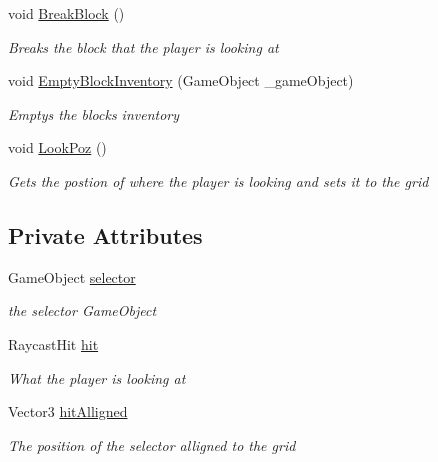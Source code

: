 \begin{DoxyCompactItemize}
void \hyperlink{class_bee_game_1_1_player_1_1_player_interact_a3507c5b70c4aecb332338d518b691875}{Break\+Block} ()
\begin{DoxyCompactList}\small\item\em Breaks the block that the player is looking at \end{DoxyCompactList}\item 
void \hyperlink{class_bee_game_1_1_player_1_1_player_interact_a5e24c97ecd41cfaceaf71d08409d8cca}{Empty\+Block\+Inventory} (Game\+Object \+\_\+game\+Object)
\begin{DoxyCompactList}\small\item\em Emptys the blocks inventory \end{DoxyCompactList}\item 
void \hyperlink{class_bee_game_1_1_player_1_1_player_interact_aacd8f7a70e55d018285ac5f0fd799fd9}{Look\+Poz} ()
\begin{DoxyCompactList}\small\item\em Gets the postion of where the player is looking and sets it to the grid \end{DoxyCompactList}\end{DoxyCompactItemize}
\subsection*{Private Attributes}
\begin{DoxyCompactItemize}
\item 
Game\+Object \hyperlink{class_bee_game_1_1_player_1_1_player_interact_ae6cde5e9d6378a1d750e442fecc9595e}{selector}
\begin{DoxyCompactList}\small\item\em the selector Game\+Object \end{DoxyCompactList}\item 
Raycast\+Hit \hyperlink{class_bee_game_1_1_player_1_1_player_interact_a39537118b4601a3596122f124b684024}{hit}
\begin{DoxyCompactList}\small\item\em What the player is looking at \end{DoxyCompactList}\item 
Vector3 \hyperlink{class_bee_game_1_1_player_1_1_player_interact_ad7b39d8900f206f680945437ff3259a8}{hit\+Alligned}
\begin{DoxyCompactList}\small\item\em The position of the selector alligned to the grid \end{DoxyCompactList}\end{DoxyCompactItemize}



